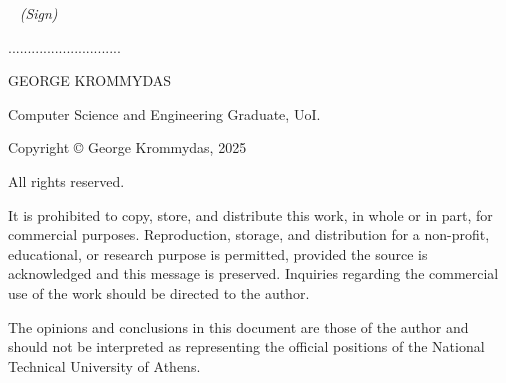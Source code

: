 ~\newpage
{}
\vspace*{\fill}
\textit{(Sign)}

\vspace{10mm}
.............................

GEORGE KROMMYDAS

Computer Science and Engineering Graduate, UoI.


\onehalfspacing
\vspace*{\fill}
\begin{flushleft}
Copyright © George Krommydas, 2025

All rights reserved.
\vspace{2.5mm}

It is prohibited to copy, store, and distribute this work, in whole or in part, for commercial purposes. Reproduction, storage, and distribution for a non-profit, educational, or research purpose is permitted, provided the source is acknowledged and this message is preserved. Inquiries regarding the commercial use of the work should be directed to the author.
\vspace{2.5mm}

The opinions and conclusions in this document are those of the author and should not be interpreted as representing the official positions of the National Technical University of Athens.
\end{flushleft}
